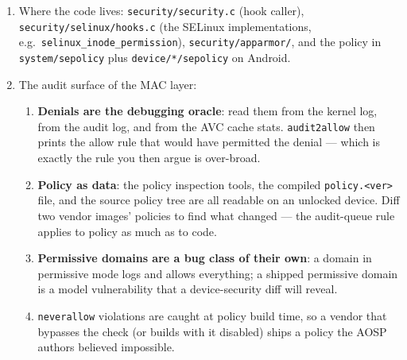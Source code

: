 \documentclass[12pt]{Training}
\begin{document}
\begin{enumerate}
\begin{enumerate}
        \item \textbf{Smack} and \lstinline{TOMOYO}: label-based and path-based respectively; rarer, but they show up in embedded and IoT firmware.
        \item \textbf{BPF-LSM}: the newer dynamic module; policy is a BPF program, so the policy is now code with its own memory-safety bug class.
    \end{enumerate}
    \item Where the code lives: \lstinline{security/security.c} (hook caller), \lstinline{security/selinux/hooks.c} (the SELinux implementations, e.g.\ \lstinline{selinux_inode_permission}), \lstinline{security/apparmor/}, and the policy in \lstinline{system/sepolicy} plus \lstinline{device/*/sepolicy} on Android.
    \item The audit surface of the MAC layer:
    \begin{enumerate}
        \item \textbf{Denials are the debugging oracle}: read them from the kernel log, from the audit log, and from the AVC cache stats. \lstinline{audit2allow} then prints the allow rule that would have permitted the denial --- which is exactly the rule you then argue is over-broad.
        \item \textbf{Policy as data}: the policy inspection tools, the compiled \lstinline{policy.<ver>} file, and the source policy tree are all readable on an unlocked device. Diff two vendor images' policies to find what changed --- the audit-queue rule applies to policy as much as to code.
        \item \textbf{Permissive domains are a bug class of their own}: a domain in permissive mode logs and allows everything; a shipped permissive domain is a model vulnerability that a device-security diff will reveal.
        \item \lstinline{neverallow} violations are caught at policy build time, so a vendor that bypasses the check (or builds with it disabled) ships a policy the AOSP authors believed impossible.
    \end{enumerate}
\end{enumerate}
\end{document}
